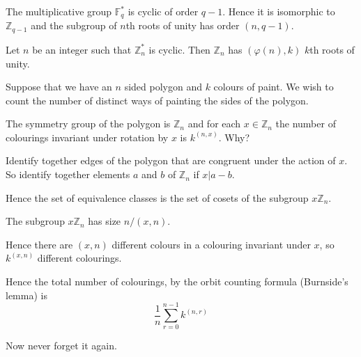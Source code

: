 \documentclass[10pt]{article}
\newenvironment{example}[1][Example]{\begin{trivlist}
\item[\hskip \labelsep {\bfseries #1}]}{\end{trivlist}}
\begin{document}
    
    \begin{example}
        The multiplicative group $\mathbb{F}_q^*$ is cyclic of
        order $q-1$. Hence it is isomorphic to $\mathbb{Z}_{q-1}$
        and the subgroup of $n$th roots of unity has order $(n,q-1)$.
    \end{example}
    \begin{example}
        Let $n$ be an integer such that $\mathbb{Z}_n^*$ is cyclic. Then
        $\mathbb{Z}_n$ has $(\varphi(n), k)$ $k$th roots of unity.
    \end{example}
    \begin{example}
        Suppose that we have an $n$ sided polygon and $k$ colours of paint.
        We wish to count the number of distinct ways of painting the sides
        of the polygon.
        
        The symmetry group of the polygon is $\mathbb{Z}_n$ and
        for each $x \in \mathbb{Z}_n$ the number of colourings
        invariant under rotation by $x$ is $k^{(n,x)}$. Why?
        
        Identify together edges of the polygon that are 
        congruent under the action of $x$. So identify together
        elements $a$ and $b$ of $\mathbb{Z}_n$ if $x|a-b$. 
        
        Hence the set of equivalence classes
        is the set of cosets of the subgroup $x\mathbb{Z}_n$. 
        
        The subgroup $x\mathbb{Z}_n$ has size $n/(x,n)$.
        
        Hence there are $(x,n)$ different colours 
        in a colouring invariant under $x$, so $k^{(x,n)}$ different
        colourings.
        
        Hence the total number of colourings, by the orbit counting
        formula (Burnside's lemma) is
        \begin{equation*}
            \frac{1}{n}\sum_{r = 0}^{n-1}k^{(n,r)}
        \end{equation*}
        
    \end{example}
    
    

    Now never forget it again.
\end{document}
